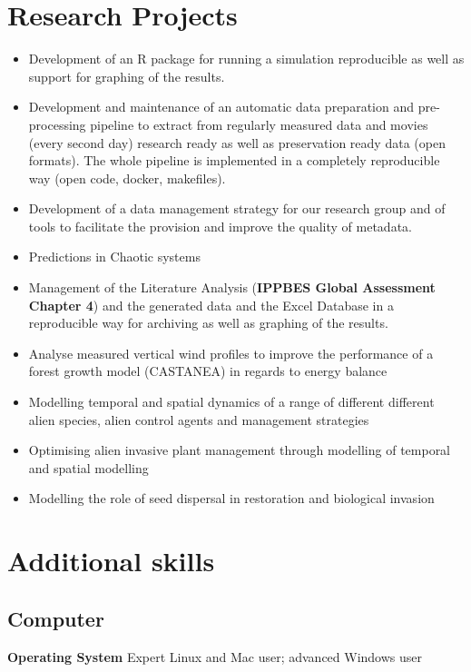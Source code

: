 \documentclass[a4paper]{article}
\begin{document}
\section{Research Projects}

\begin{itemize}
\item Development of an R package for running a simulation reproducible as well as support for graphing of the results. 
\item Development and maintenance of an automatic data preparation and pre-processing pipeline to extract from regularly measured data and movies (every second day) research ready  as well as preservation ready data (open formats). The whole pipeline is implemented in a completely reproducible way (open code, docker, makefiles).
\item Development of a data management strategy for our research group and of tools to facilitate the provision and
improve the quality of metadata. \item Predictions in Chaotic systems
\item Management of the Literature Analysis (\textbf{IPPBES Global Assessment Chapter 4}) and the generated data and the Excel Database in a reproducible way for archiving as well as graphing of the results.
\item Analyse measured vertical wind profiles to improve the performance of a forest growth model (CASTANEA) in regards to energy balance
\item Modelling temporal and spatial dynamics of a range of different different alien species, alien control agents and 
management strategies
\item Optimising alien invasive plant management through modelling of temporal and spatial modelling
\item Modelling the role of seed dispersal in restoration and biological invasion
\end{itemize}


\section{Additional skills}

\subsection{Computer}

\textbf{Operating System} Expert Linux and Mac user; advanced Windows user
\end{document}
